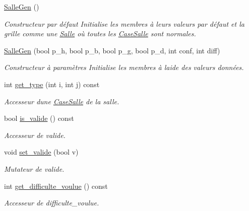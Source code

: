 \begin{DoxyCompactItemize}
\item 
\hyperlink{classSalleGen_a43963479681e4a2795c04c916ee74c44}{Salle\+Gen} ()
\begin{DoxyCompactList}\small\item\em Constructeur par défaut Initialise les membres à leurs valeurs par défaut et la grille comme une \hyperlink{classSalle}{Salle} où toutes les \hyperlink{classCaseSalle}{Case\+Salle} sont normales. \end{DoxyCompactList}\item 
\hyperlink{classSalleGen_abd4c76d720255b7a2bdf4d744cc8fa8a}{Salle\+Gen} (bool p\+\_\+h, bool p\+\_\+b, bool p\+\_\+g, bool p\+\_\+d, int conf, int diff)
\begin{DoxyCompactList}\small\item\em Constructeur à paramètres Initialise les membres à l\textquotesingle{}aide des valeurs données. \end{DoxyCompactList}\item 
int \hyperlink{classSalleGen_a75685bdd1ce85294ac285b907aa26803}{get\+\_\+type} (int i, int j) const 
\begin{DoxyCompactList}\small\item\em Accesseur d\textquotesingle{}une \textquotesingle{}\hyperlink{classCaseSalle}{Case\+Salle}\textquotesingle{} de la salle. \end{DoxyCompactList}\item 
bool \hyperlink{classSalleGen_a1e4204bc7355d2f3f540f8ed1e92b28e}{is\+\_\+valide} () const 
\begin{DoxyCompactList}\small\item\em Accesseur de {\itshape valide}. \end{DoxyCompactList}\item 
void \hyperlink{classSalleGen_a70a00ece0f63c097bc27f4c9754605ee}{set\+\_\+valide} (bool v)
\begin{DoxyCompactList}\small\item\em Mutateur de {\itshape valide}. \end{DoxyCompactList}\item 
int \hyperlink{classSalleGen_a04a7e2b7e52c52d90b61b51442f1b3ae}{get\+\_\+difficulte\+\_\+voulue} () const 
\begin{DoxyCompactList}\small\item\em Accesseur de {\itshape difficulte\+\_\+voulue}. \end{DoxyCompactList}\item 

\end{DoxyCompactItemize}
